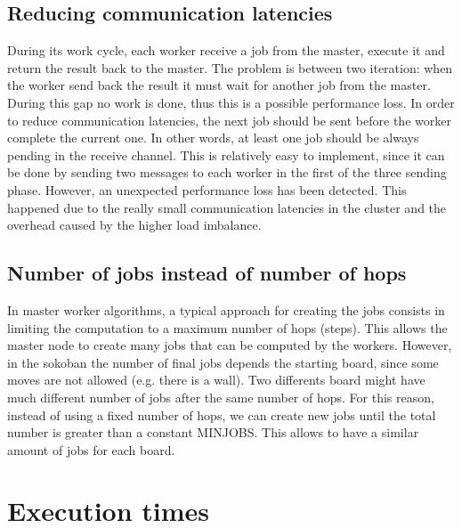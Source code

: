 \documentclass{article}
\begin{document}
\subsection{Reducing communication latencies} \label{sec:reducinglatencies}
During its work cycle, each worker receive a job from the master, execute it and return the result back to the master. The problem is between two iteration: when the worker send back the result it must wait for another job from the master. During this gap no work is done, thus this is a possible performance loss. In order to reduce communication latencies, the next job should be sent before the worker complete the current one. In other words, at least one job should be always pending in the receive channel. This is relatively easy to implement, since it can be done by sending two messages to each worker in the first of the three sending phase. However, an unexpected performance loss has been detected. This happened due to the really small communication latencies in the cluster and the overhead caused by the higher load imbalance.

\subsection{Number of jobs instead of number of hops}
In master worker algorithms, a typical approach for creating the jobs consists in limiting the computation to a maximum number of hops (steps). This allows the master node to create many jobs that can be computed by the workers. However, in the sokoban the number of final jobs depends the starting board, since some moves are not allowed (e.g. there is a wall). Two differents board might have much different number of jobs after the same number of hops. For this reason, instead of using a fixed number of hops, we can create new jobs until the total number is greater than a constant MINJOBS. This allows to have a similar amount of jobs for each board.


\appendix

\section{Execution times}
\end{document}
